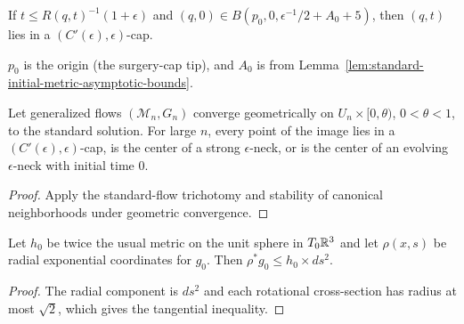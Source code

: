 \begin{corollary}
\label{cor:standard-solution-cap-near-tip}
\label{stdsolncap}

If $t\le R(q,t)^{-1}(1+\epsilon)$ and
$(q,0)\in B(p_0,0,\epsilon^{-1}/2+A_0+5)$, then $(q,t)$ lies in a
$(C'(\epsilon),\epsilon)$-cap.
\end{corollary}

\begin{remark}
\label{rem:tip-and-a0-definitions}

$p_0$ is the origin (the surgery-cap tip), and $A_0$ is from
Lemma~\ref{lem:standard-initial-metric-asymptotic-bounds}.
\end{remark}

\begin{corollary}
\label{cor:generalized-flow-limit-trichotomy}
\label{stdsolnlimit}

Let generalized flows $({\mathcal M}_n,G_n)$ converge geometrically on
$U_n\times[0,\theta)$, $0<\theta<1$, to the standard solution. For large
$n$, every point of the image lies in a $(C'(\epsilon),\epsilon)$-cap,
is the center of a strong $\epsilon$-neck, or is the center of an evolving
$\epsilon$-neck with initial time $0$.
\end{corollary}
\begin{proof}
\sketch Apply the standard-flow trichotomy and stability of canonical
neighborhoods under geometric convergence.
\end{proof}

\begin{lemma}
\label{lem:standard-initial-metric-distance-decreasing}
\label{decrease}

Let $h_0$ be twice the usual metric on the unit sphere in $T_0\mathbb{R}^3$ and
let $\rho(x,s)$ be radial exponential coordinates for $g_0$. Then
$\rho^*g_0\le h_0\times ds^2$.
\end{lemma}
\begin{proof}
\sketch The radial component is $ds^2$ and each rotational cross-section
has radius at most $\sqrt2$, which gives the tangential inequality.
\end{proof}
